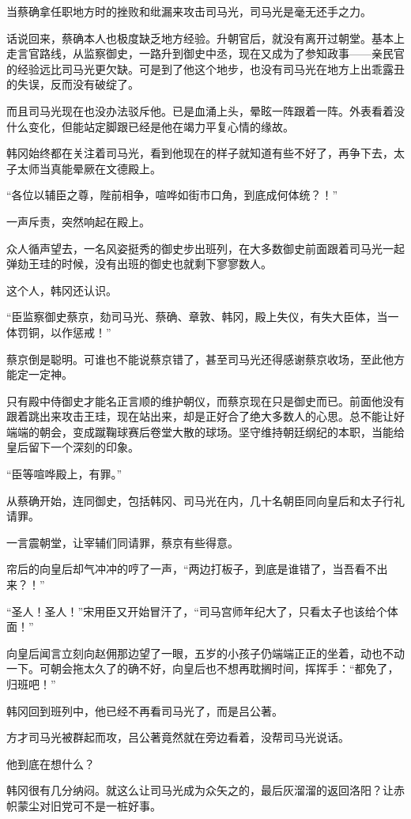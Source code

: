 当蔡确拿任职地方时的挫败和纰漏来攻击司马光，司马光是毫无还手之力。

话说回来，蔡确本人也极度缺乏地方经验。升朝官后，就没有离开过朝堂。基本上走言官路线，从监察御史，一路升到御史中丞，现在又成为了参知政事——亲民官的经验远比司马光更欠缺。可是到了他这个地步，也没有司马光在地方上出乖露丑的失误，反而没有破绽了。

而且司马光现在也没办法驳斥他。已是血涌上头，晕眩一阵跟着一阵。外表看着没什么变化，但能站定脚跟已经是他在竭力平复心情的缘故。

韩冈始终都在关注着司马光，看到他现在的样子就知道有些不好了，再争下去，太子太师当真能晕厥在文德殿上。

“各位以辅臣之尊，陛前相争，喧哗如街市口角，到底成何体统？！”

一声斥责，突然响起在殿上。

众人循声望去，一名风姿挺秀的御史步出班列，在大多数御史前面跟着司马光一起弹劾王珪的时候，没有出班的御史也就剩下寥寥数人。

这个人，韩冈还认识。

“臣监察御史蔡京，劾司马光、蔡确、章敦、韩冈，殿上失仪，有失大臣体，当一体罚铜，以作惩戒！”

蔡京倒是聪明。可谁也不能说蔡京错了，甚至司马光还得感谢蔡京收场，至此他方能定一定神。

只有殿中侍御史才能名正言顺的维护朝仪，而蔡京现在只是御史而已。前面他没有跟着跳出来攻击王珪，现在站出来，却是正好合了绝大多数人的心思。总不能让好端端的朝会，变成蹴鞠球赛后卷堂大散的球场。坚守维持朝廷纲纪的本职，当能给皇后留下一个深刻的印象。

“臣等喧哗殿上，有罪。”

从蔡确开始，连同御史，包括韩冈、司马光在内，几十名朝臣同向皇后和太子行礼请罪。

一言震朝堂，让宰辅们同请罪，蔡京有些得意。

帘后的向皇后却气冲冲的哼了一声，“两边打板子，到底是谁错了，当吾看不出来？！”

“圣人！圣人！”宋用臣又开始冒汗了，“司马宫师年纪大了，只看太子也该给个体面！”

向皇后闻言立刻向赵佣那边望了一眼，五岁的小孩子仍端端正正的坐着，动也不动一下。可朝会拖太久了的确不好，向皇后也不想再耽搁时间，挥挥手：“都免了，归班吧！”

韩冈回到班列中，他已经不再看司马光了，而是吕公著。

方才司马光被群起而攻，吕公著竟然就在旁边看着，没帮司马光说话。

他到底在想什么？

韩冈很有几分纳闷。就这么让司马光成为众矢之的，最后灰溜溜的返回洛阳？让赤帜蒙尘对旧党可不是一桩好事。

